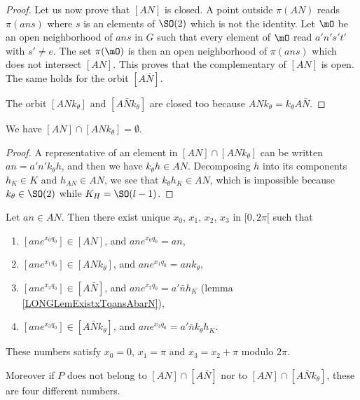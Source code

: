 \begin{proof}
    Let us now prove that $[AN]$ is closed. A point outside $\pi(AN)$ reads $\pi(ans)$ where $s$ is an elements of $\SO(2)$ which is not the identity. Let $\mO$ be an open neighborhood of $ans$ in $G$ such that every element of $\mO$ read $a'n's't'$ with $s'\neq e$. The set $\pi(\mO)$ is then an open neighborhood of $\pi(ans)$ which does not intersect $[AN]$. This proves that the complementary of $[AN]$ is open. The same holds for the orbit $[A\bar N]$.
    
    The orbit $[ANk_{\theta}]$ and $[A\bar Nk_{\theta}]$ are closed too because $ANk_{\theta}=k_{\theta}A\bar N$.

\end{proof}

%
\begin{lemma}
    We have $[AN]\cap[ANk_{\theta}]=\emptyset$.
\end{lemma}

\begin{proof}
    A representative of an element in $[AN]\cap[ANk_{\theta}]$ can be written $an=a'n'k_{\theta}h$, and then we have $k_{\theta}h\in AN$. Decomposing $h$ into its components $h_K\in K$ and $h_{AN}\in AN$, we see that $k_{\theta}h_K\in AN$, which is impossible because $k_{\theta}\in\SO(2)$ while $K_H=\SO(l-1)$.
\end{proof}

\begin{proposition}        \label{LONGPropUniquexxxxANANbarktheta}
    Let $an\in AN$. Then there exist unique $x_0$, $x_1$, $x_2$, $x_3$ in $\mathopen[ 0 , 2\pi [$ such that
    \begin{enumerate}
        \item
            $[an e^{x_0q_0}]\in[AN]$, and $an e^{x_0q_0}=an$,
        \item
            $[an e^{x_1q_0}]\in[ANk_{\theta}]$, and $an e^{x_1q_0}=ank_{\theta}$,
        \item
            $[an e^{x_2q_0}]\in[A\bar N]$, and $an e^{x_2q_0}=a'\bar n h_K$ (lemma \ref{LONGLemExistxTqansAbarN}),
        \item
            $[an e^{x_3q_0}]\in[A\bar Nk_{\theta}]$, and $an e^{x_3q_0}=a'\bar nk_{\theta}h_K$.
    \end{enumerate}
    These numbers satisfy $x_0=0$, $x_1=\pi$ and $x_3=x_2+\pi$ modulo $2\pi$. 

    Moreover if $P$ does not belong to $[AN]\cap[A\bar N]$ nor to $[AN]\cap[A\bar Nk_{\theta}]$, these are four different numbers.
\end{proposition}

